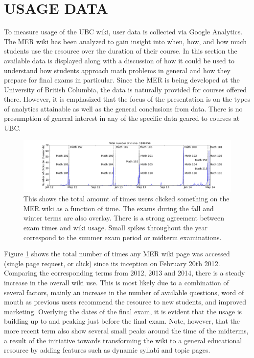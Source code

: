 \documentclass{primus}
\begin{document}
\section{USAGE DATA}\label{sec:Usage_Data}
To measure usage of the UBC wiki, user data is collected via Google Analytics. The MER wiki has been analyzed to gain insight into when, how, and how much students use the resource over the duration of their course. In this section the available data is displayed along with a discussion of how it could be used to understand how students approach math problems in general and how they prepare for final exams in particular.  Since the MER is being developed at the University of British Columbia, the data is naturally provided for courses offered there.  However, it is emphasized that the focus of the presentation is on the types of analytics attainable as well as the general conclusions from data.  There is no presumption of general interest in any of the specific data geared to courses at UBC.

\begin{figure}[H]
\centering
\includegraphics[width=\textwidth]{figs/total_number_of_clicks_time_series.png}
\caption{This shows the total amount of times users clicked something on the MER wiki as a function of time. The exams during the fall and winter terms are also overlay. There is a strong agreement between exam times and wiki usage. Small spikes throughout the year correspond to the summer exam period or midterm examinations.}\label{fig:total_number_of_clicks_time_series}
\end{figure}

\noindent{}Figure \ref{fig:total_number_of_clicks_time_series} shows the total number of times any MER wiki page was accessed (single page request, or click) since its inception on February 20th 2012. Comparing the corresponding terms from 2012, 2013 and 2014, there is  a steady increase in the overall wiki use. This is most likely due to a combination of several factors, mainly an increase in the number of available questions, word of mouth as previous users recommend the resource to new students, and improved marketing. Overlying the dates of the final exam, it is evident that the usage is building up to and peaking just before the final exam. Note, however, that the more recent term also show several small peaks around the time of the midterms, a result of the initiative towards transforming the wiki to a general educational resource by adding features such as dynamic syllabi and topic pages.
\end{document}
